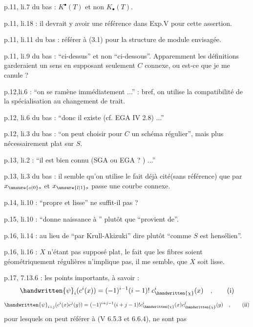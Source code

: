 
p.11, li.7 du bas : $K^{\bullet}(T)$ et non $K_{\bullet}(T)$.

p.11, li.18 : il devrait y avoir une référence dans Exp.V pour cette assertion.

p.11, li.11 du bas : référer à (3.1) pour la structure de module envisagée.

p.11, li.9 du bas : ``ci-dessus'' et non ``ci-dessous''. Apparemment les définitions garderaient un sens en supposant seulement $C$ connexe, ou est-ce que je me canule ?

p.12,li.6 : ``on se ramène immédiatement ...'' : bref, on utilise la compatibilité de la spécialisation au changement de trait.

p.12, li.6 du bas : ``donc il existe (cf. EGA IV 2.8) ...''

p.12, li.3 du bas : ``on peut choisir pour $C$ un schéma régulier'', mais plus nécessairement plat sur $S$.

p.13, li.2 : ``il est bien connu (SGA ou EGA ? ) ...''


p.13, li.3 du bas : il semble qu'on utilise le fait déjà cité(sans référence) que par $x_{\unsure{o|0}s}$ et $x_{\unsure{l|1}s}$ passe une courbe connexe.

p.14, li.10 : ``propre et lisse'' ne suffit-il pas ?

p.15, li.10 : ``donne naissance à '' plutôt que ``provient de''.

p.16, li.14 : au lieu de ``par Krull-Akizuki'' dire plutôt ``comme $S$ est hensélien''.

p.16, li.16 : $X$ n'étant pas supposé plat, le fait que les fibres soient géométriquement régulières n'implique pas, il me semble, que $X$ soit lisse.


p.17, 7.13.6 : les points importants, à savoir :
\begingroup
\makeatletter\tagsleft@true\makeatother
\[
\handwritten{\psi}_i(c^i(x)) = (-1)^{i-1}(i-1)!\;c^i_{\handwritten{\chi}}(x)\quad,\tag*{(i)}
\]
\[
\handwritten{\psi}_{i+j}(c^i(x)c^j(y)) = (-1)^{i+j-1}(i+j-1)!c^i_{\handwritten{\chi}}(x)c^j_{\handwritten{\chi}}(y)\quad,\tag*{(ii)}
\]
\endgroup
pour lesquels on peut référer à (V 6.5.3 et 6.6.4), ne sont pas

